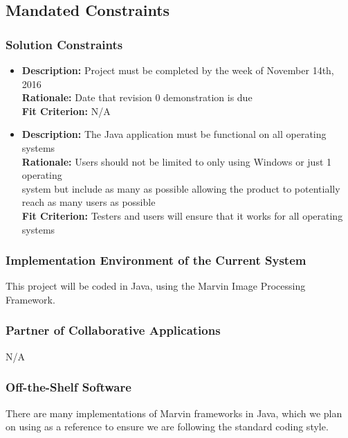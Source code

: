 \documentclass[12pt, titlepage]{article}
\begin{document}
\subsection{Mandated Constraints}

\subsubsection{Solution Constraints}
\begin{itemize}
  \item {\bf Description:} Project must be completed by the week of November 14th, 2016\\
        {\bf Rationale:} Date that revision 0 demonstration is due\\
        {\bf Fit Criterion:} N/A \\
  \item {\bf Description:} The Java application must be functional on all operating systems\\
        {\bf Rationale:} Users should not be limited to only using Windows or just 1 operating\\ system but include as many as possible allowing the product to potentially reach as many users as possible\\
        {\bf Fit Criterion:} Testers and users will ensure that it works for all operating systems
  \end{itemize}
  
\subsubsection{Implementation Environment of the Current System}

This project will be coded in Java, using the Marvin Image Processing Framework.

\subsubsection{Partner of Collaborative Applications}

N/A

\subsubsection{Off-the-Shelf Software}

There are many implementations of Marvin frameworks in Java, which we plan on using as a reference to ensure we are following the standard coding style.
\end{document}
